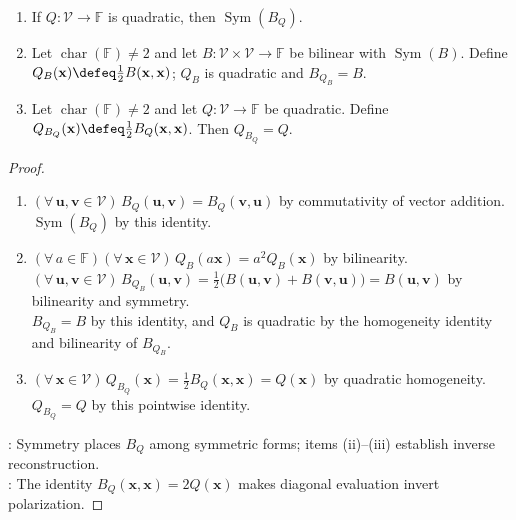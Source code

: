 \begin{proposition} \label{prop:quadratic-forms-symmetric-bilinear-forms} 
\begin{enumerate}[label=(\roman*)]
\setlength{\itemsep}{0pt}
\item If $Q:\mathcal{V}\to\mathbb{F}$ is quadratic, then $\operatorname{Sym}(B_Q)$.
\item Let $\operatorname{char}(\mathbb{F})\neq2$ and let $B:\mathcal{V}\times\mathcal{V}\to\mathbb{F}$ be bilinear with $\operatorname{Sym}(B)$. Define $Q_B(\mathbf{x})\defeq\frac{1}{2}B(\mathbf{x},\mathbf{x})$; $Q_B$ is quadratic and $B_{Q_B}=B$.
\item Let $\operatorname{char}(\mathbb{F})\neq2$ and let $Q:\mathcal{V}\to\mathbb{F}$ be quadratic. Define $Q_{B_Q}(\mathbf{x})\defeq\frac{1}{2}B_Q(\mathbf{x},\mathbf{x})$. Then $Q_{B_Q}=Q$.
\end{enumerate}
\begin{proof}
\begin{enumerate}[label=(\roman*)]
\setlength{\itemsep}{0pt}
\item[$(i)$] $(\forall\,\mathbf{u},\mathbf{v}\in\mathcal{V})\,B_Q(\mathbf{u},\mathbf{v})=B_Q(\mathbf{v},\mathbf{u})$ by commutativity of vector addition. $\operatorname{Sym}(B_Q)$ by this identity.
\item[$(ii)$] $(\forall\,a\in\mathbb{F})(\forall\,\mathbf{x}\in\mathcal{V})\,Q_B(a\mathbf{x})=a^2Q_B(\mathbf{x})$ by bilinearity.\\
$(\forall\,\mathbf{u},\mathbf{v}\in\mathcal{V})\,B_{Q_B}(\mathbf{u},\mathbf{v})=\frac{1}{2}\bigl(B(\mathbf{u},\mathbf{v})+B(\mathbf{v},\mathbf{u})\bigr)=B(\mathbf{u},\mathbf{v})$ by bilinearity and symmetry.\\
$B_{Q_B}=B$ by this identity, and $Q_B$ is quadratic by the homogeneity identity and bilinearity of $B_{Q_B}$.
\item[$(iii)$] $(\forall\,\mathbf{x}\in\mathcal{V})\,Q_{B_Q}(\mathbf{x})=\frac{1}{2}B_Q(\mathbf{x},\mathbf{x})=Q(\mathbf{x})$ by quadratic homogeneity. $Q_{B_Q}=Q$ by this pointwise identity.
\end{enumerate}
: Symmetry places $B_Q$ among symmetric forms; items (ii)--(iii) establish inverse reconstruction.\\
: The identity $B_Q(\mathbf{x},\mathbf{x})=2Q(\mathbf{x})$ makes diagonal evaluation invert polarization.
\end{proof}
\end{proposition}

